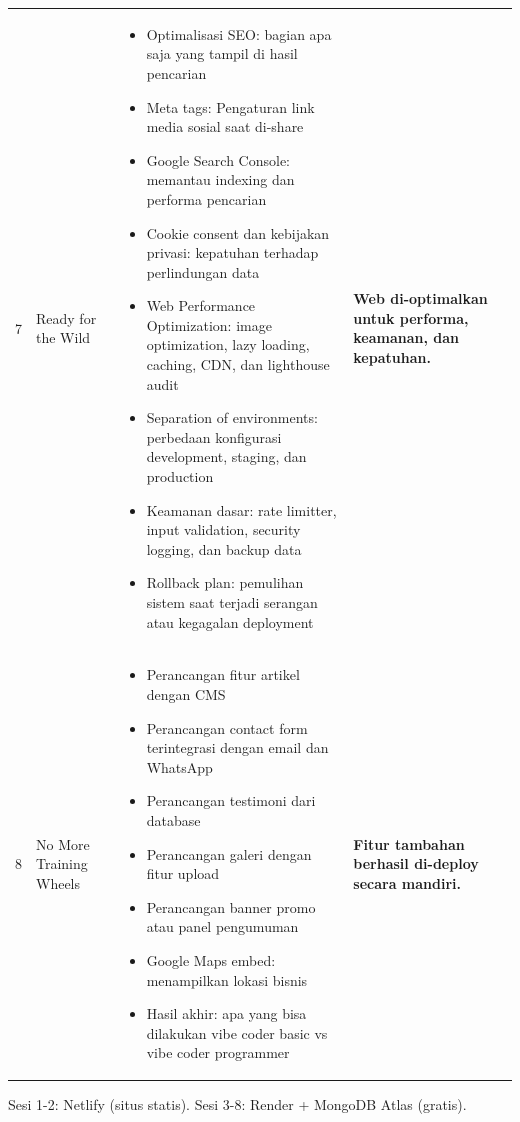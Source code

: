 \documentclass[10pt,a4paper]{article}
\begin{document}
{\begin{tabularx}{\textwidth}{c P{2cm} >{\raggedright\arraybackslash}X P{3.8cm}}
7 & Ready for the Wild
& \begin{itemize}[nosep,leftmargin=*]
\item Optimalisasi SEO: bagian apa saja yang tampil di hasil pencarian
\item Meta tags: Pengaturan link media sosial saat di-share
\item Google Search Console: memantau indexing dan performa pencarian
\item Cookie consent dan kebijakan privasi: kepatuhan terhadap perlindungan data
\item Web Performance Optimization: image optimization, lazy loading, caching, CDN, dan lighthouse audit
\item Separation of environments: perbedaan konfigurasi development, staging, dan production
\item Keamanan dasar: rate limitter, input validation, security logging, dan backup data
\item Rollback plan: pemulihan sistem saat terjadi serangan atau kegagalan deployment
\end{itemize}
& \textbf{Web di-optimalkan untuk performa, keamanan, dan kepatuhan.}\\

8 & No More Training Wheels
& \begin{itemize}[nosep,leftmargin=*]
\item Perancangan fitur artikel dengan CMS
\item Perancangan contact form terintegrasi dengan email dan WhatsApp
\item Perancangan testimoni dari database
\item Perancangan galeri dengan fitur upload
\item Perancangan banner promo atau panel pengumuman
\item Google Maps embed: menampilkan lokasi bisnis
\item Hasil akhir: apa yang bisa dilakukan vibe coder basic vs vibe coder programmer
\end{itemize}
& \textbf{Fitur tambahan berhasil di-deploy secara mandiri.}\\
\bottomrule
\end{tabularx}
}

\vspace{6pt}

 {\footnotesize Sesi 1-2: Netlify (situs statis). Sesi 3-8: Render + MongoDB Atlas (gratis).}

\vspace{4pt}
\end{document}
